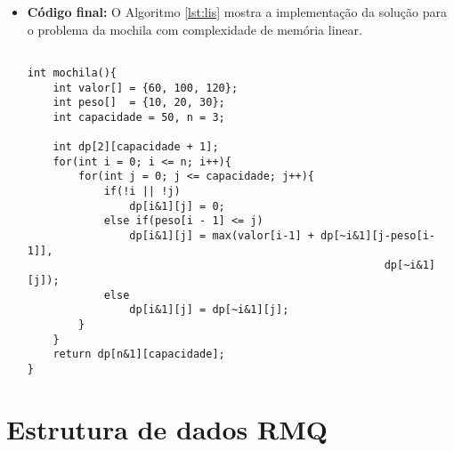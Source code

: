 \begin{itemize}[leftmargin=-.001in]
\item \textbf{Código final:} 
O Algoritmo \ref{lst:lis} mostra a implementação da solução para o problema da mochila com complexidade de memória linear.
\begin{lstlisting}[caption={Implementação Mochila em C++},label={lst:lis}]

int mochila(){
	int valor[] = {60, 100, 120};
	int peso[]  = {10, 20, 30};
	int capacidade = 50, n = 3;

	int dp[2][capacidade + 1];
	for(int i = 0; i <= n; i++){
		for(int j = 0; j <= capacidade; j++){
			if(!i || !j)
				dp[i&1][j] = 0;
			else if(peso[i - 1] <= j)
				dp[i&1][j] = max(valor[i-1] + dp[~i&1][j-peso[i-1]],
														dp[~i&1][j]);
			else
				dp[i&1][j] = dp[~i&1][j];
		}
	}
	return dp[n&1][capacidade]; 
}
\end{lstlisting}
\end{itemize}


\section{Estrutura de dados RMQ}

